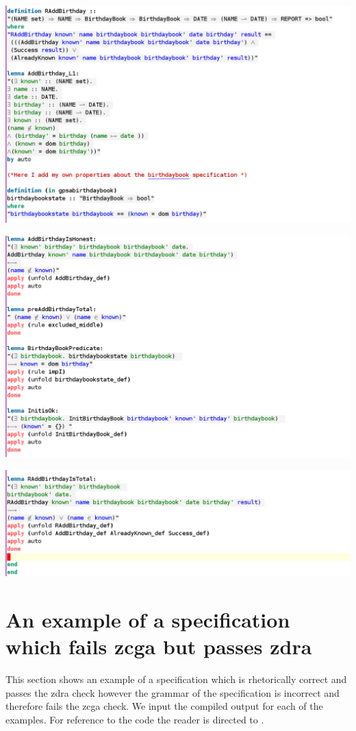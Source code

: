 \noindent \includegraphics[scale=0.4]{examples/bb/6imagec.png}

\noindent \includegraphics[scale=0.4]{examples/bb/6imaged.png}

\noindent \includegraphics[scale=0.4]{examples/bb/6imagee.png}
%

\section{An example of a specification which fails \gls{zcga} but passes \gls{zdra}}
\label{app:nonworkingzcga}
This section shows an example of a specification which is rhetorically correct and passes the \gls{zdra} check however the grammar of the specification is incorrect and therefore fails the \gls{zcga} check. We input the compiled output for each of the examples. For reference to the code the reader is directed to \cite{mathlangexamples}.


